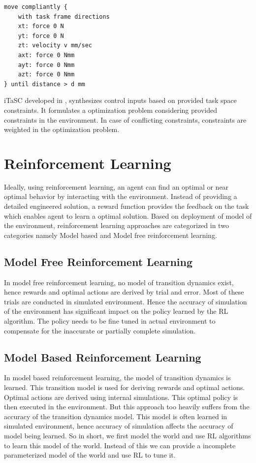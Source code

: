 \documentclass[thesis]{mas_proposal}
\begin{document}
\begin{lstlisting}[label=tff,caption=Task Specification using TFF: Open Door]
move compliantly {
	with task frame directions
	xt: force 0 N
	yt: force 0 N
	zt: velocity v mm/sec
	axt: force 0 Nmm
	ayt: force 0 Nmm
	azt: force 0 Nmm
} until distance > d mm 
\end{lstlisting}


iTaSC developed in \cite{DeSchutter-ijrr2007, DecreBruyninckxDeSchutter2013, decre09}, synthesizes control inputs based on provided task space constraints. It formulates a optimization problem considering provided constraints in the environment. In case of conflicting constraints, constraints are weighted in the optimization problem. 

\chapter{Reinforcement Learning}

Ideally, using reinforcement learning, an agent can find an optimal or near optimal behavior by interacting with the environment. Instead of providing a detailed engineered solution, a reward function provides the feedback on the task which enables agent to learn a optimal solution. Based on deployment of model of the environment, reinforcement learning approaches are categorized in two categories namely Model based and Model free reinforcement learning. 

\section{Model Free Reinforcement Learning}

In model free reinforcement learning, no model of transition dynamics exist, hence rewards and optimal actions are derived by trial and error\cite{polydoros2017survey}. Most of these trials are conducted in simulated environment. Hence the accuracy of simulation of the environment has significant impact on  the policy learned by the RL algorithm. The policy needs to be fine tuned in actual environment to compensate for the inaccurate or partially complete simulation.

\section{Model Based Reinforcement Learning} \label{mod-RL}
In model based  reinforcement learning, the model of transition dynamics is learned. This transition model is used for deriving rewards and optimal actions. Optimal actions are derived using internal simulations. This optimal policy is then executed in the environment. But this approach too heavily suffers from the accuracy of the transition dynamics model. This model is often learned in simulated environment, hence accuracy of simulation affects the accuracy of model being learned. So in short, we first model the world and use RL algorithms to learn this model of the world. Instead of this we can provide a incomplete parameterized model of the world and use RL to tune it.  
\end{document}
